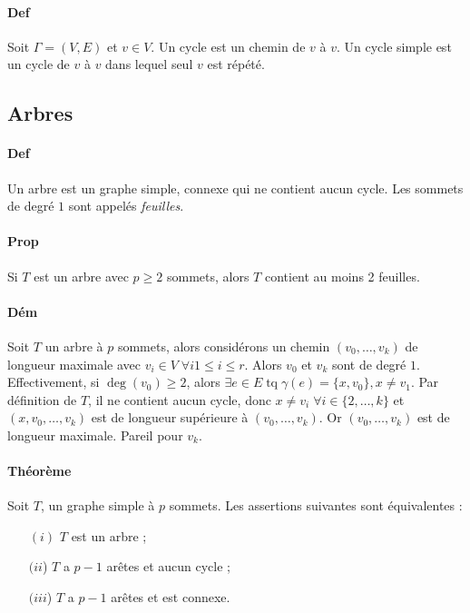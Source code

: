 \documentclass{article}
\DeclareMathOperator{\tq}{\text{ tq }}
\begin{document}
			\paragraph{Def} Soit $\Gamma = (V, E)$ et $v \in V$. Un cycle est un chemin de $v$ à $v$. Un cycle simple est un cycle de $v$ à $v$ dans
			lequel seul $v$ est répété.

		\subsection{Arbres}
			\paragraph{Def} Un arbre est un graphe simple, connexe qui ne contient aucun cycle. Les sommets de degré $1$ sont appelés \textit{feuilles}.

			\paragraph{Prop} Si $T$ est un arbre avec $p \geq 2$ sommets, alors $T$ contient au moins 2 feuilles.

			\paragraph{Dém} Soit $T$ un arbre à $p$ sommets, alors considérons un chemin $(v_0, \ldots, v_k)$ de longueur maximale avec
			$v_i \in V \; \forall i 1 \leq i \leq r$. Alors $v_0$ et $v_k$ sont de degré $1$. Effectivement, si $\deg(v_0) \geq 2$, alors
			$\exists e \in E \tq \gamma(e) = \{x, v_0\}, x \neq v_1$. Par définition de $T$, il ne contient aucun cycle, donc
			$x \neq v_i \; \forall i \in \{2, \ldots, k\}$ et $(x, v_0, \ldots, v_k)$ est de longueur supérieure à $(v_0, \ldots, v_k)$. Or $(v_0, \ldots, v_k)$ est de
			longueur maximale. Pareil pour $v_k$.

			\paragraph{Théorème} Soit $T$, un graphe simple à $p$ sommets. Les assertions suivantes sont équivalentes :
				\begin{itemize}
					\item[$(i)$] $T$ est un arbre ;
					\item[$(ii$)] $T$ a $p-1$ arêtes et aucun cycle ;
					\item[$(iii$)] $T$ a $p-1$ arêtes et est connexe.
				\end{itemize}
\end{document}
